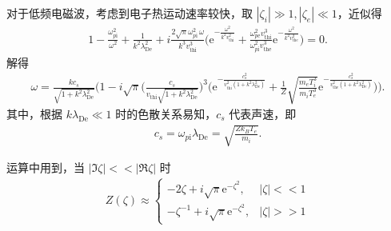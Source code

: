 \begin{exbox}
	对于低频电磁波，考虑到电子热运动速率较快，取 \(|\zeta_i|\gg1, |\zeta_e|\ll1\)，近似得
	\begin{align*}
		1 - \frac{\omega_{p\mathrm{i}}^2}{\omega^2} + \frac{1}{k^2\lambda_{\mathrm{De}}^2} + i\frac{2\sqrt{\pi}\omega_{p\mathrm{i}}^2\,\omega}{k^3v_{\mathrm{thi}}^3}\bigg(\mathrm{e}^{-\frac{\omega^2}{k^2v_{\mathrm{thi}}^2}}+\frac{\omega_{p\mathrm{e}}^2v_{\mathrm{thi}}^3}{\omega_{p\mathrm{i}}^2v_{\mathrm{the}}^3}\mathrm{e}^{-\frac{\omega^2}{k^2v_{\mathrm{the}}^2}}\bigg) = 0.
	\end{align*}
	解得
	\begin{align*}
		\omega = \frac{k c_s}{\sqrt{1+k^2\lambda_{\mathrm{De}}^2}}\Bigg(1 - i\sqrt{\pi}\bigg(\frac{c_s}{v_{\mathrm{thi}}\sqrt{1+k^2\lambda_{\mathrm{De}}^2}}\bigg)^3\bigg(\mathrm{e}^{-\frac{c_s^2}{v_{\mathrm{thi}}^2\left(1+k^2\lambda_{\mathrm{De}}^2\right)}} + \frac{1}{Z}\sqrt{\frac{m_e T_i^3}{m_i T_e^3}}\mathrm{e}^{-\frac{c_s^2}{v_{\mathrm{the}}^2\left(1+k^2\lambda_{\mathrm{De}}^2\right)}}\bigg)\Bigg).
	\end{align*}
	其中，根据 \(k\lambda_{\mathrm{De}}\ll1\) 时的色散关系易知，\(c_s\) 代表声速，即
	\begin{align*}
		c_s = \omega_{p\mathrm{i}}\lambda_{\mathrm{De}} = \sqrt{\frac{Zk_B T_e}{m_i}}.
	\end{align*}

	运算中用到，当 \(|\Im\zeta|<<|\Re\zeta|\) 时
	\begin{align*}
		Z(\zeta)\approx
		\begin{cases}
			-2\zeta + i\sqrt{\pi}\mathrm{e}^{-\zeta^2},     & |\zeta|<<1 \\
			-\zeta^{-1} + i\sqrt{\pi}\mathrm{e}^{-\zeta^2}, & |\zeta|>>1
		\end{cases}
	\end{align*}
\end{exbox}
